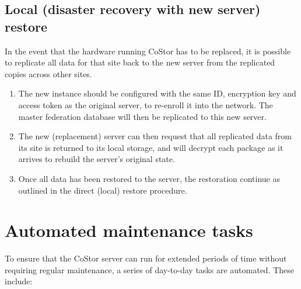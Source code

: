 \documentclass[bsc,frontabs,twoside,singlespacing,parskip,deptreport]{infthesis}     %
\begin{document}
\subsection{Local (disaster recovery with new server) restore}

In the event that the hardware running CoStor has to be replaced, it is possible to replicate
all data for that site back to the new server from the replicated copies across other sites.

\begin{enumerate}
	\item The new instance should be configured with the same ID, encryption key and access 
	token as the original server, to re-enroll it into the network. The master federation 
	database will then be replicated to this new server.
	\item The new (replacement) server can then request that all replicated data from its site
	is returned to its local storage, and will decrypt each package as it arrives to rebuild
	the server's original state.
	\item Once all data has been restored to the server, the restoration continue as outlined
	in the direct (local) restore procedure.
\end{enumerate}

\section{Automated maintenance tasks}

To ensure that the CoStor server can run for extended periods of time without requiring regular
maintenance, a series of day-to-day tasks are automated. These include:
\end{document}
